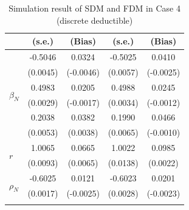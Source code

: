 \begin{table}[!ht]
{{\begin{minipage}{0.5\textwidth}
\begin{tabular}{lcccc}
        & (s.e.) & (Bias) & (s.e.) & (Bias) \\
        \midrule
        \multirow{6}{*}{$\beta_N$} & -0.5046 & 0.0324 & -0.5025 & 0.0410 \\
         & (0.0045) & (-0.0046) & (0.0057) & (-0.0025) \\
        \cmidrule{2-5}
         & 0.4983 & 0.0205 & 0.4988 & 0.0245 \\
         & (0.0029) & (-0.0017) & (0.0034) & (-0.0012) \\
        \cmidrule{2-5}
         & 0.2038 & 0.0382 & 0.1990 & 0.0466 \\
         & (0.0053) & (0.0038) & (0.0065) & (-0.0010) \\
        \midrule
        \multirow{2}{*}{$r$} & 1.0065 & 0.0665 & 1.0022 & 0.0985 \\
         & (0.0093) & (0.0065) & (0.0138) & (0.0022) \\
        \midrule
        \multirow{2}{*}{$\rho_N$} & -0.6025 & 0.0121 & -0.6023 & 0.0201 \\
         & (0.0017) & (-0.0025) & (0.0028) & (-0.0023) \\
        \hhline{=====}
        \end{tabular}
    \end{minipage}
}
}
\caption{Simulation result of SDM and FDM in Case 4 (discrete deductible)}\label{tab:AppSimEndCase4}
\end{table}

